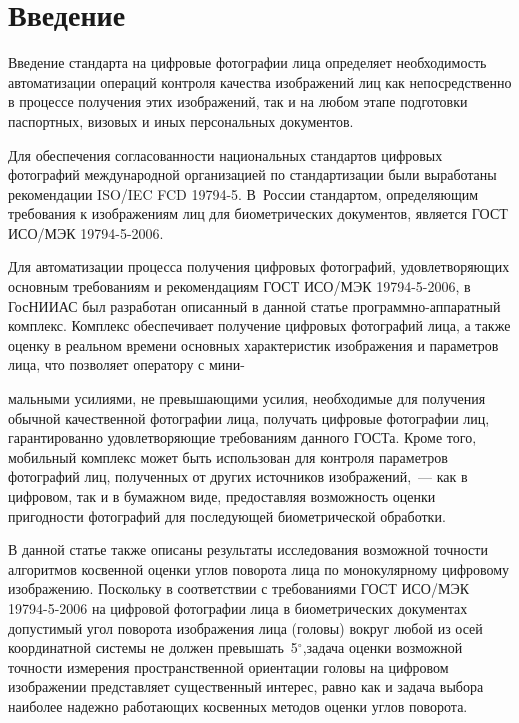       \thispagestyle{headings}

      \begin{multicols}{2}

      \label{st\stat}

      

\section{Введение}

Введение стандарта на цифровые фотографии лица определяет необходимость автоматизации операций контроля качества 
изображений лиц как непосредственно в процессе получения этих изоб\-ра\-же\-ний, 
так и на любом этапе подготовки паспортных, 
визовых и иных персональных доку\-ментов.
{

}

Для обеспечения согласованности национальных стандартов цифровых фотографий международной организацией по 
стандартизации были выработаны рекомендации ISO/IEC FCD
\mbox{19794-5}. В~России стандартом, определяющим требования к 
изображениям лиц для биометрических документов, является ГОСТ ИСО/МЭК 19794-5-2006.
{

}

Для автоматизации процесса получения циф\-ро\-вых фотографий, удовлетворяющих основным требованиям и рекомендациям 
ГОСТ ИСО/МЭК 19794-5-2006, в ГосНИИАС был разработан описанный в данной статье программно-аппаратный комплекс. 
Комплекс обеспечивает получение цифро\-вых фотографий лица, а также оценку в реальном времени основных характеристик 
изображения и параметров лица, что позволяет оператору с мини-\linebreak\vspace*{-12pt}
\columnbreak

\noindent
мальными усилиями, не превышающими усилия, необходимые 
для получения обычной качественной фотографии лица, получать циф\-ро\-вые фотографии лиц, гарантированно удовле\-тво\-ря\-ющие 
требованиям данного ГОСТа. Кроме того, мобильный комплекс может быть использован для контроля параметров фотографий 
лиц, полученных от других источников изображений,~--- как в цифровом, так и в бумажном виде, предоставляя возможность 
оценки пригодности фотографий для последующей биометрической обра\-ботки.
{ %

}

В данной статье также описаны результаты исследования возможной точности алгоритмов косвенной оценки углов поворота лица 
по монокулярному цифровому изображению. Поскольку в соответ\-ствии с требованиями ГОСТ ИСО/МЭК 19794-5-2006 на 
цифровой фотографии лица в биометрических документах допустимый угол поворота изоб\-ра\-же\-ния лица (головы) вокруг любой 
из осей координатной системы не должен превышать~5$^\circ$,\linebreak задача оценки возможной точности измерения 
пространственной ориентации головы на цифровом изоб\-ра\-же\-нии представляет существенный интерес, равно как и задача выбора 
наиболее надежно работающих косвенных методов оценки углов по\-во\-рота.
{

}
\end{multicols}
